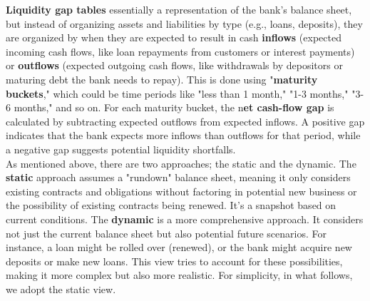 \documentclass[11pt]{report}
\begin{document}
 \textbf{Liquidity gap tables} essentially a representation of the bank's balance sheet, but instead of organizing assets and liabilities by type (e.g., loans, deposits), they are organized by when they are expected to result in cash \textbf{inflows} (expected incoming cash flows, like loan repayments from customers or interest payments) or \textbf{outflows} (expected outgoing cash flows, like withdrawals by depositors or maturing debt the bank needs to repay). This is done using "\textbf{maturity buckets}," which could be time periods like "less than 1 month," "1-3 months," "3-6 months," and so on. For each maturity bucket, the n\textbf{et cash-flow gap} is calculated by subtracting expected outflows from expected inflows. A positive gap indicates that the bank expects more inflows than outflows for that period, while a negative gap suggests potential liquidity shortfalls.\\
 
As mentioned above, there are two approaches; the static and the dynamic. The \textbf{static} approach assumes a "rundown" balance sheet, meaning it only considers existing contracts and obligations without factoring in potential new business or the possibility of existing contracts being renewed. It's a snapshot based on current conditions.
The \textbf{dynamic} is a more comprehensive approach. It considers not just the current balance sheet but also potential future scenarios. For instance, a loan might be rolled over (renewed), or the bank might acquire new deposits or make new loans. This view tries to account for these possibilities, making it more complex but also more realistic.
For simplicity, in what follows, we adopt the static view.
\end{document}
